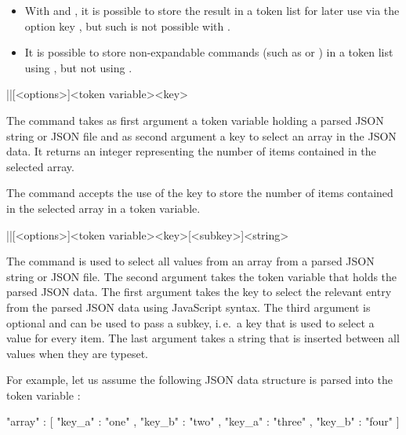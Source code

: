 \documentclass[a4paper]{article}
\begin{document}
{{\begin{itemize}
  \item With \macro{\JSONParseArrayUse} and \macro{\JSONParseArrayMapInline}, it is possible to store the result in a token list for later use via the option key , but such is not possible with \macro{\JSONParseArrayMapFunction}.
  \item It is possible to store non-expandable commands (such as \macro{\emph} or \macro{\textbf}) in a token list using \macro{\JSONParseArrayUse}, but not using \macro{\JSONParseArrayMapInline}.
\end{itemize}

\begin{macrodef}
|\JSONParseArrayCount|[<options>]{<token variable>}{<key>}
\end{macrodef}
The command \macro{\JSONParseArrayCount} takes as first argument a token variable holding a parsed JSON string or JSON file and as second argument a key to select an array in the JSON data. It returns an integer representing the number of items contained in the selected array.

The command \macro{\JSONParseArrayCount} accepts the use of the key  to store the number of items contained in the selected array in a token variable.

\begin{macrodef}
|\JSONParseArrayUse|[<options>]{<token variable>}{<key>}[<subkey>]{<string>}
\end{macrodef}
The command \macro{\JSONParseArrayUse} is used to select all values from an array from a parsed JSON string or JSON file. The second argument takes the token variable that holds the parsed JSON data. The first argument takes the key to select the relevant entry from the parsed JSON data using JavaScript syntax. The third argument is optional and can be used to pass a subkey, i.\,e.\ a key that is used to select a value for every item. The last argument takes a string that is inserted between all values when they are typeset.

For example, let us assume the following JSON data structure is parsed into the token variable \macro{\myJSONdata}:

\begin{codeexample}
{
  "array" : [
    {
      "key_a" : "one" ,
      "key_b" : "two"
    } ,
    {
      "key_a" : "three" ,
      "key_b" : "four"
    }
  ]
}
\end{codeexample}

}}
\end{document}
